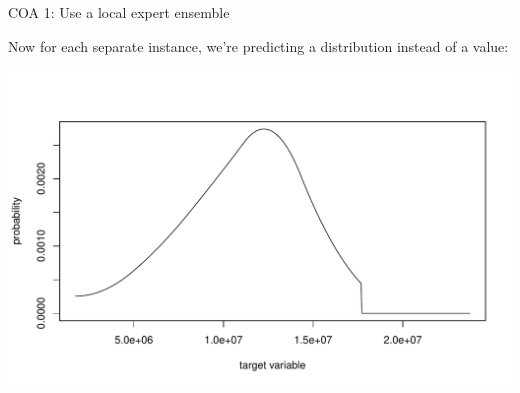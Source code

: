 \documentclass[ignorenonframetext,]{beamer}
\begin{document}
\begin{frame}[fragile]{COA 1: Use a local expert ensemble}

Now for each separate instance, we're predicting a distribution instead
of a value:

\footnotesize
\includegraphics{presentation_files/figure-beamer/unnamed-chunk-16-1.pdf}


\end{frame}
\end{document}
